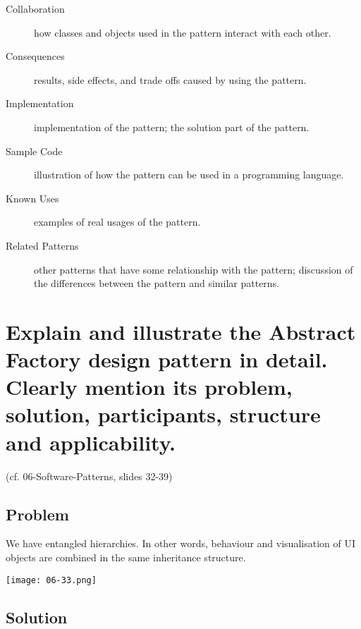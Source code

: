 \begin{description}
\item[Collaboration]

	how classes and objects used in the pattern interact with each other.

\item[Consequences]

	results, side effects, and trade offs caused by using the pattern.

\item[Implementation]

	implementation of the pattern; the solution part of the pattern.

\item[Sample Code]

	illustration of how the pattern can be used in a programming language.

\item[Known Uses]

	examples of real usages of the pattern.

\item[Related Patterns]

	other patterns that have some relationship with the pattern; discussion of the differences between the pattern and similar patterns.
\end{description}


\section{Explain and illustrate the Abstract Factory design pattern in detail.
Clearly mention its problem, solution, participants, structure and applicability.}

(cf. 06-Software-Patterns, slides 32-39)\\


\subsection{Problem}

We have entangled hierarchies. In other words, behaviour and visualisation of UI objects are combined in the same inheritance structure.

\begin{center}
\texttt{[image: 06-33.png]}
\end{center}



\subsection{Solution}

